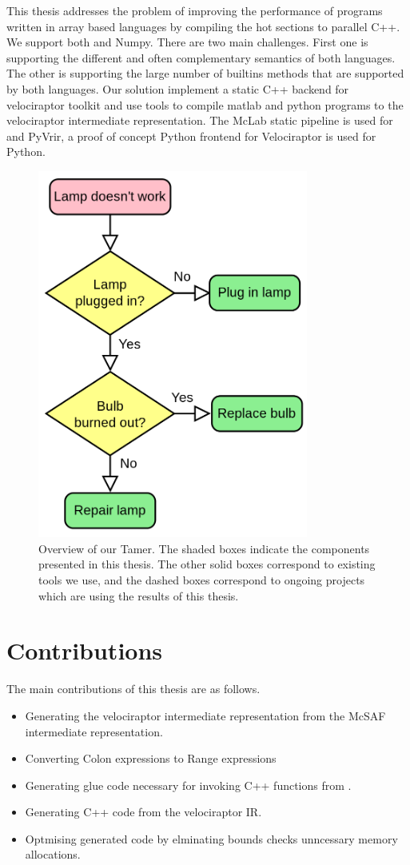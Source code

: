 This thesis addresses the problem of improving the performance of programs written in array based languages by compiling the hot sections to parallel C++. We support both \matlab and Numpy. There are two main challenges. First one is supporting the different and often complementary semantics of both languages. The other is supporting the large number of builtins methods that are supported by both languages.
Our solution implement a static C++ backend for velociraptor toolkit and use tools to compile matlab and python programs to the velociraptor intermediate representation. The McLab static pipeline is used for \matlab and PyVrir, a proof of concept Python frontend for Velociraptor is used for Python. 

\begin{figure}[htbp]
\begin{center}
\includegraphics[width=3.5in]{Figures/overview.png}
\caption[Overview of the \matlab Tamer]{Overview
of our \matlab Tamer.  The shaded boxes indicate the components
presented in this thesis.  The other solid boxes correspond to
existing \mclab tools we use, and the dashed boxes correspond to
ongoing projects which are using the results of this
thesis.}\label{Fig:Overview}
\end{center}
\end{figure}
\section{Contributions}
The main contributions of this thesis are as follows.
\begin{itemize}
\item Generating the velociraptor intermediate representation from the McSAF intermediate representation. 
\item Converting Colon expressions to Range expressions
\item Generating glue code necessary for invoking C++ functions from \matlab.
\item Generating C++ code from the velociraptor IR.
\item Optmising generated code by elminating bounds checks unncessary memory allocations. 
\end{itemize}
